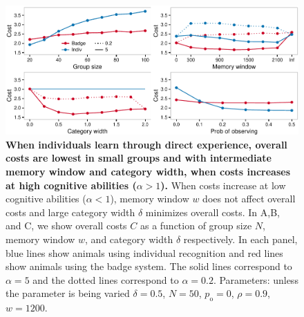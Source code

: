 \begin{figure}
\includegraphics[width=6.85in]{figures/costs.pdf}
\caption{\sffamily\small\textbf{When individuals learn through direct experience, overall costs are lowest in small groups and with intermediate memory window and category width, when costs increases at high cognitive abilities ($\alpha>1$).} When costs increase at low cognitive abilities ($\alpha<1$), memory window $w$ does not affect overall costs and large category width $\delta$ minimizes overall costs. In A,B, and C, we show overall costs $C$ as a function of group size $N$, memory window $w$, and category width $\delta$ respectively. In each panel, blue lines show animals using individual recognition and red lines show animals using the badge system. The solid lines correspond to $\alpha=5$ and the dotted lines correspond to $\alpha=0.2$.  Parameters: unless the parameter is being varied $\delta = 0.5$, $N=50$, $p_\text{o}=0$, $\rho=0.9$, $w=1200$.}
\label{costs}
\end{figure}

